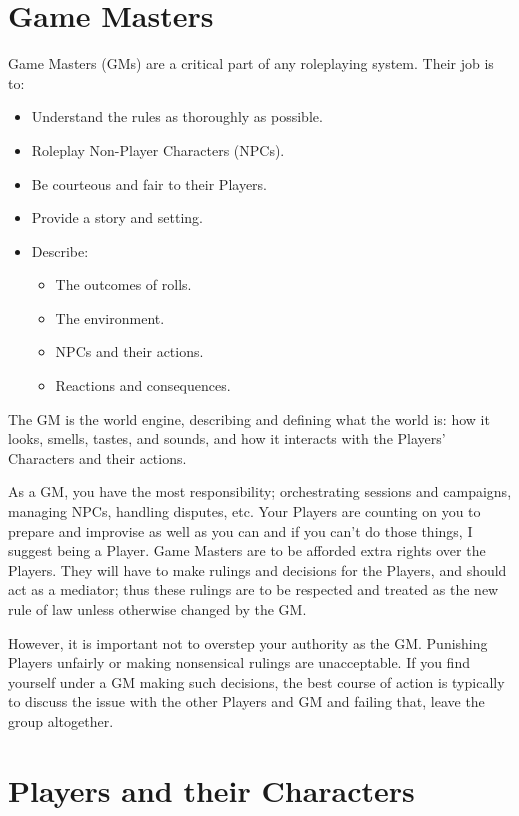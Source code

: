 \documentclass[../main.tex]{subfiles}
\begin{document}
    \section{Game Masters}

    Game Masters (GMs) are a critical part of any roleplaying system. Their job is to:

    \begin{itemize}
        \item Understand the rules as thoroughly as possible.
        \item Roleplay Non-Player Characters (NPCs).
        \item Be courteous and fair to their Players.
        \item Provide a story and setting.
        \item Describe:
        \begin{itemize}
            \item The outcomes of rolls.
            \item The environment.
            \item NPCs and their actions.
            \item Reactions and consequences.
        \end{itemize}
    \end{itemize}
    
    The GM is the world engine, describing and defining what the world is: how it looks, smells, tastes, and sounds, and how it interacts with the Players' Characters and their actions.
    
    As a GM, you have the most responsibility; orchestrating sessions and campaigns, managing NPCs, handling disputes, etc. Your Players are counting on you to prepare and improvise as well as you can and if you can't do those things, I suggest being a Player.
    Game Masters are to be afforded extra rights over the Players. They will have to make rulings and decisions for the Players, and should act as a mediator; thus these rulings are to be respected and treated as the new rule of law unless otherwise changed by the GM.

    However, it is important not to overstep your authority as the GM. Punishing Players unfairly or making nonsensical rulings are unacceptable. If you find yourself under a GM making such decisions, the best course of action is typically to discuss the issue with the other Players and GM and failing that, leave the group altogether.

    \section{Players and their Characters}
\end{document}
